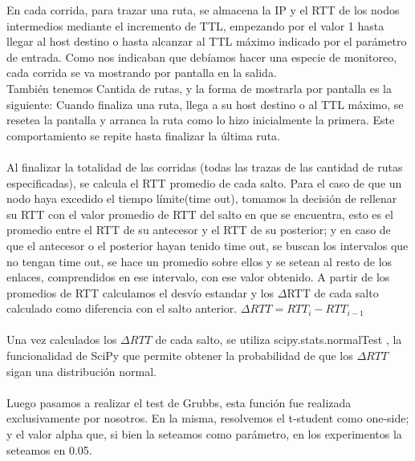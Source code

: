 En cada corrida, para trazar una ruta, se almacena la IP y el RTT de los nodos intermedios mediante el incremento de TTL, empezando por el valor 1 hasta llegar al host destino o hasta alcanzar al TTL máximo indicado por el parámetro de entrada. Como nos indicaban que deb\'iamos hacer una especie de monitoreo, cada corrida se va mostrando por pantalla en la salida.\\
Tambi\'en tenemos Cantida de rutas, y la forma de mostrarla por pantalla es la siguiente: Cuando finaliza una ruta, llega a su host destino o al TTL m\'aximo, se resetea la pantalla y arranca la ruta como lo hizo inicialmente la primera. Este comportamiento se repite hasta finalizar la \'ultima ruta.
\\
\\
Al finalizar la totalidad de las corridas (todas las trazas de las cantidad de rutas especificadas), se calcula el RTT promedio de cada salto. Para el caso de que un nodo haya excedido el tiempo límite(time out), tomamos la decisión de rellenar su RTT con el valor promedio de RTT del salto en que se encuentra, esto es el promedio entre el RTT de su antecesor y el RTT de su posterior; y en caso de que el antecesor o el posterior hayan tenido time out, se buscan los intervalos que no tengan time out, se hace un promedio sobre ellos y se setean al resto de los enlaces, comprendidos en ese intervalo, con ese valor obtenido. A partir de los promedios de RTT calculamos el desvío estandar y los $\Delta$RTT de cada salto calculado como diferencia con el salto anterior.
$\Delta RTT = RTT_{i} - RTT _{i-1}$
\\
\\
Una vez calculados los $\Delta RTT$ de cada salto, se utiliza scipy.stats.normalTest , la funcionalidad de SciPy que permite obtener la probabilidad de que los $\Delta RTT$ sigan una distribución normal.
\\
\\
Luego pasamos a realizar el test de Grubbs, esta funci\'on fue realizada exclusivamente por nosotros. En la misma, resolvemos el t-student como one-side; y el valor alpha que, si bien la seteamos como par\'ametro, en los experimentos la seteamos en 0.05.



